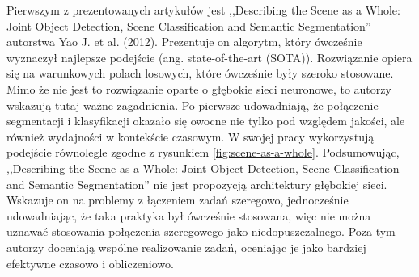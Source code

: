 \vspace{0.5cm}

Pierwszym z prezentowanych artykułów jest ,,Describing the Scene as a Whole: Joint Object Detection, Scene Classification and Semantic Segmentation'' autorstwa Yao J. et al. (2012)\cite{yao2012describing}. Prezentuje on algorytm, który ówcześnie wyznaczył najlepsze podejście (ang. state-of-the-art (SOTA)). Rozwiązanie opiera się na warunkowych polach losowych, które ówcześnie były szeroko stosowane. Mimo że nie jest to rozwiązanie oparte o głębokie sieci neuronowe, to autorzy wskazują tutaj ważne zagadnienia. Po pierwsze udowadniają, że połączenie segmentacji i klasyfikacji okazało się owocne nie tylko pod względem jakości, ale również wydajności w kontekście czasowym. W swojej pracy wykorzystują podejście równolegle zgodne z rysunkiem \ref{fig:scene-as-a-whole}. Podsumowując, ,,Describing the Scene as a Whole: Joint Object Detection, Scene Classification and Semantic Segmentation'' nie jest propozycją architektury głębokiej sieci. Wskazuje on na problemy z łączeniem zadań szeregowo, jednocześnie udowadniając, że taka praktyka był ówcześnie stosowana, więc nie można uznawać stosowania połączenia szeregowego jako niedopuszczalnego. Poza tym autorzy doceniają wspólne realizowanie zadań, oceniając je jako bardziej efektywne czasowo i obliczeniowo.

